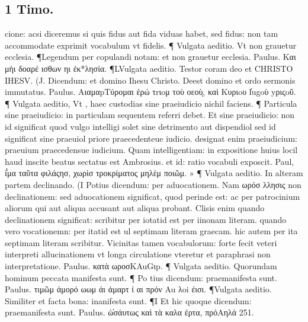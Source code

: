 \documentclass{article}
\begin{document}
\begin{pages}
\section*{1 Timo. }
\marginpar{[ p.211 ]}\pstart cione: acsi diceremus si quis fidus aut fida viduas habet, sed fidus: non tam accommodate exprimit vocabulum vt fidelis. ¶ Vulgata aeditio. Vt non grauetur ecclesia. ¶Legendum per copulandi notam: et non grauetur ecclesia. Paulus. Και μὴι δοαρέ ισθων ηι ἐκ*λησία. ¶LVulgata aeditio. Testor coram deo et CHRISTO IHESV. (J. Dicendum: et domino Ihesu Christo. Deest domino et ordo sermonis immutatus. Paulus. AιαμαpΤύρομαι ἐρώ τrιoμ τοὺ οεοὺͅ, καὶ Κυριoυ l̓ugoὺ yριςoῦ. ¶ Vulgata aeditio, Vt , haec custodias sine praeiudicio nichil faciens. ¶ Particula sine praeiudicio: in particulam sequentem referri debet. Et sine praeiudicio: non id significat quod vulgo intelligi solet sine detrimento aut dispendiol sed id significat sine praeuiol priore praecedenteue iudicio. designat enim praeiudicium: praeuium praecedensue iudicium. Quam intelligentiam: in expositione huius locil haud inscite beatus sectatus est Ambrosius. et id: ratio vocabuli exposcit. Paul, i̓́μα ταῦτα φιλάςησ, χωρὶσ τροκρίματος μηλὲμ ποιῶμ. » ¶ Vulgata aeditio. In alteram partem declinando. (I Potius dicendum: per aduocationem. Nam ωρόσ λλησις non declinationem: sed aduocationem significat, quod perinde est: ac per patrocinium aliorum qui aut aliqua accusant aut aliqua probant. Clisis enim quando declinationem significat: scribitur per iotatid est per iinonam literam. quando vero vocationemn: per itatid est ul septimam literam graecam. hic autem per ita septimam literam scribitur. Vicinitas tamen vocabulorum: forte fecit veteri interpreti allucinationem vt longa circulatione vteretur et paraphrasi non interpretatione. Paulus. κατὰ ωροσΚAuGιp. ¶ Vulgata aeditio. Quorundam hominum peccata manifesta sunt. ¶ Po tius dicendum: praemanifesta sunt. Paulus. τιμῶμ ἀμορό ωωμ ἀι ἀμαρτ ἰ αι πρόν Au λoi ἐισι. ¶Vulgata aeditio. Similiter et facta bona: inanifesta sunt. ¶I Et hic quoque  dicendum: praemanifesta sunt. Paulus. ὡ̓σάυτως καὶ τὰ καλα ἐρτα, πρόAηλά 251.  \pend

\end{pages}
\end{document}
